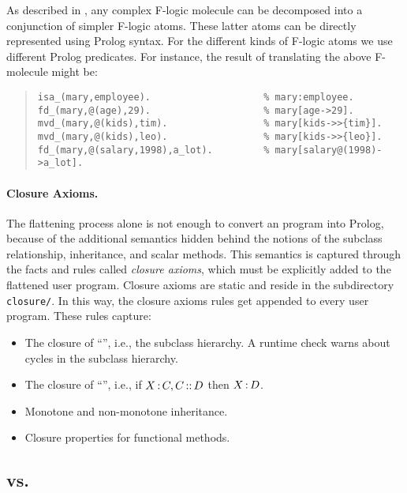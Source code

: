 \documentclass[11pt]{report}
\begin{document}
As described in \cite{KLW95}, any complex F-logic molecule can be
decomposed into a conjunction of simpler F-logic atoms. These latter atoms
can be directly represented using Prolog syntax.  For the different kinds
of F-logic atoms we use different Prolog predicates. For instance, the
result of translating the above F-molecule might be:

\begin{quote}
{\small \begin{verbatim}
isa_(mary,employee).                    % mary:employee.
fd_(mary,@(age),29).                    % mary[age->29].
mvd_(mary,@(kids),tim).                 % mary[kids->>{tim}].
mvd_(mary,@(kids),leo).                 % mary[kids->>{leo}].
fd_(mary,@(salary,1998),a_lot).         % mary[salary@(1998)->a_lot].
\end{verbatim}}
\end{quote}



\paragraph{Closure Axioms.}

The flattening process alone is not enough to convert an \fl program
into Prolog, because of the additional semantics hidden behind the notions of
the subclass relationship, inheritance, and scalar methods. This semantics
is captured through the facts and rules called \emph{closure axioms}, which
must be explicitly added to the flattened user program.  Closure axioms are
static and reside in the subdirectory \texttt{closure/}. In this way, the
closure axioms rules get appended to every user program. These rules capture:

\begin{itemize}
\item The closure of ``\subcl'', i.e., the subclass hierarchy.  A
  runtime check warns about cycles in the subclass hierarchy.
\item The closure of ``\isa'', i.e., if $X\,{\bf{:}}\, C, C\,{\bf{::}}\, D$ then
  $X\,{\bf{:}}\, D$. 
\item Monotone and non-monotone inheritance.
\item Closure properties for functional methods.
\end{itemize}


\subsection{\FLORA vs. \FLORID}
\end{document}

